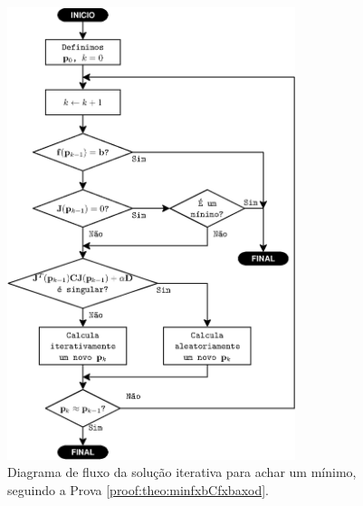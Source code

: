 \begin{figure}[!h]
     \centering
         \includegraphics[width=0.75\textwidth]{chapters/minimization-fx/fluxo3.eps}
        \caption{Diagrama de fluxo da solução iterativa para achar um mínimo, seguindo a Prova \ref{proof:theo:minfxbCfxbaxod}.}
        \label{fig:fluxo3}
\end{figure}
